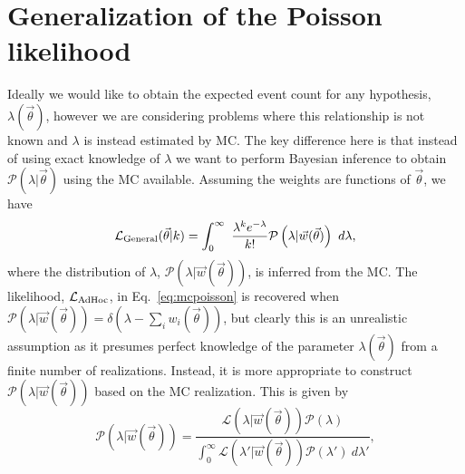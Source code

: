 \documentclass[a4paper, 11pt]{article}
\newcommand{\like}{\mathcal{L}}
\newcommand{\vectheta}{\vec{\theta}}
\newcommand{\vecw}{\vec{w}}
\newcommand{\prob}{\mathcal{P}}
\newcommand{\adhoc}{\mathcal{L}_{\textmd{AdHoc}}}
\begin{document}
\section{Generalization of the Poisson likelihood\label{sec:generalization_poisson}}


Ideally we would like to obtain the expected event count for any hypothesis, $\lambda(\vectheta)$, however we are considering problems where this relationship is not known and $\lambda$ is instead estimated by MC. The key difference here is that instead of using exact knowledge of $\lambda$ we want to perform Bayesian inference to obtain $\prob(\lambda|\vectheta)$ using the MC available. Assuming the weights are functions of $\vectheta$, we have 
\begin{equation} \label{eq:generalpoisson}
\like_{\rm General}(\vectheta|k) = \int_{0}^{\infty}~\frac{\lambda^{k}e^{-\lambda}}{k!}\prob\left(\lambda|\vecw(\vectheta)\right)~d\lambda,
\end{equation}
where the distribution of $\lambda$, $\prob\left(\lambda|\vecw(\vectheta)\right)$, is inferred from the MC. %
The likelihood, $\adhoc$, in Eq.~\eqref{eq:mcpoisson} is recovered when $\prob(\lambda|\vecw(\vectheta)) = \delta\left(\lambda - \sum_{i}{w_i(\vectheta)}\right)$, but clearly this is an unrealistic assumption as it presumes perfect knowledge of the parameter $\lambda(\vectheta)$ from a finite number of realizations. Instead, it is more appropriate to construct $\prob(\lambda|\vecw(\vectheta))$ based on the MC realization. This is given by
\begin{equation} \label{eq:posterior}
\prob\left(\lambda|\vecw(\vectheta)\right) = \frac{\like(\lambda|\vecw(\vectheta))\prob(\lambda)}{\int_0^\infty \like(\lambda'|\vecw(\vectheta))\prob(\lambda')~d\lambda'},
\end{equation}
\end{document}
